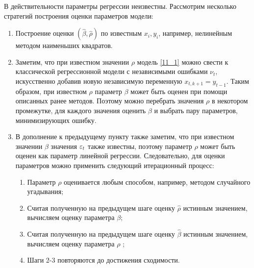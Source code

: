В действительности параметры регрессии неизвестны.
Рассмотрим несколько стратегий построения оценки параметров модели:
\begin{enumerate}
\item
    Построение оценки $\left( \hat\beta, \hat\rho \right)$ по известным $x_i, y_i$, например, нелинейным методом наименьших квадратов.
\item
    Заметим, что при известном значении $\rho$ модель \eqref{11_1} можно свести к классической регрессионной модели с независимыми ошибками $\nu_t$, искусственно добавив новую независимую переменную $x_{t,k+1} = y_{t-1}$.
    Таким образом, при известном $\rho$ параметр $\beta$ может быть оценен при помощи описанных ранее методов.
    Поэтому можно перебрать значения $\rho$ в некотором промежутке, для каждого значения оценить $\beta$ и выбрать пару параметров, минимизирующих ошибку.
\item
    В дополнение к предыдущему пункту также заметим, что при известном значении $\beta$ значения $\varepsilon_t$ также известны, поэтому параметр $\rho$ может быть оценен как параметр линейной регрессии.
    Следовательно, для оценки параметров можно применить следующий итерационный процесс:
    \begin{enumerate}
    \item
        Параметр $\rho$ оценивается любым способом, например, методом случайного угадывания;
    \item
        Считая полученную на предыдущем шаге оценку $\hat\rho$  истинным значением, вычисляем оценку параметра $\beta$;
    \item
        Считая полученную на предыдущем шаге оценку $\hat\beta$ истинным значением, вычисляем оценку параметра $\rho$ ;
    \item
        Шаги 2-3 повторяются до достижения сходимости.
    \end{enumerate}
\end{enumerate}

